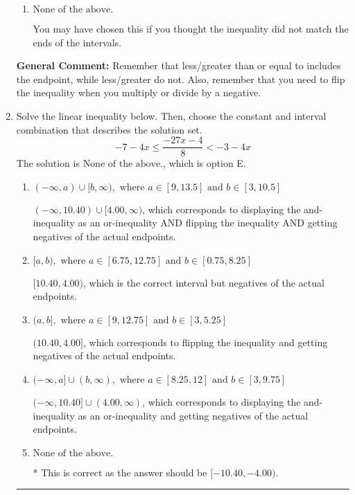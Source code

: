 \documentclass{extbook}[14pt]
\newcommand{\litem}[1]{\item #1

\rule{\textwidth}{0.4pt}}
\begin{document}
\begin{enumerate}
{\begin{enumerate}[label=\Alph*.]
 $[-1.0, \infty)$, which corresponds to switching the direction of the interval AND negating the endpoint. You likely did this if you did not flip the inequality when dividing by a negative as well as not moving values over to a side properly.
\item \( \text{None of the above}. \)

You may have chosen this if you thought the inequality did not match the ends of the intervals.
\end{enumerate}

\textbf{General Comment:} Remember that less/greater than or equal to includes the endpoint, while less/greater do not. Also, remember that you need to flip the inequality when you multiply or divide by a negative.
}
\litem{
Solve the linear inequality below. Then, choose the constant and interval combination that describes the solution set.
\[ -7 - 4 x \leq \frac{-27 x - 4}{8} < -3 - 4 x \]The solution is \( \text{None of the above.} \), which is option E.\begin{enumerate}[label=\Alph*.]
\item \( (-\infty, a) \cup [b, \infty), \text{ where } a \in [9, 13.5] \text{ and } b \in [3, 10.5] \)

$(-\infty, 10.40) \cup [4.00, \infty)$, which corresponds to displaying the and-inequality as an or-inequality AND flipping the inequality AND getting negatives of the actual endpoints.
\item \( [a, b), \text{ where } a \in [6.75, 12.75] \text{ and } b \in [0.75, 8.25] \)

$[10.40, 4.00)$, which is the correct interval but negatives of the actual endpoints.
\item \( (a, b], \text{ where } a \in [9, 12.75] \text{ and } b \in [3, 5.25] \)

$(10.40, 4.00]$, which corresponds to flipping the inequality and getting negatives of the actual endpoints.
\item \( (-\infty, a] \cup (b, \infty), \text{ where } a \in [8.25, 12] \text{ and } b \in [3, 9.75] \)

$(-\infty, 10.40] \cup (4.00, \infty)$, which corresponds to displaying the and-inequality as an or-inequality and getting negatives of the actual endpoints.
\item \( \text{None of the above.} \)

* This is correct as the answer should be $[-10.40, -4.00)$.
\end{enumerate}

}
\end{enumerate}
\end{document}
